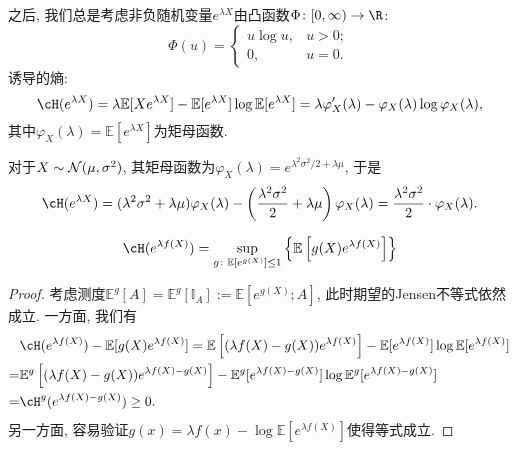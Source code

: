 之后, 我们总是考虑非负随机变量$e^{\lambda X}$由凸函数$\Phi \colon [0, \infty) \to \R$: 
\begin{equation*}
	\Phi(u) = 
	\begin{cases}
		u \log u, & u > 0; \\ 0, & u = 0. 
	\end{cases}
\end{equation*}
诱导的熵: 
\begin{equation}\label{eq:EntropyByMGF}
	\cH(e^{\lambda X}) 
	= \lambda \mathbb{E}[ X e^{\lambda X}] - \mathbb{E}[e^{\lambda X}] \log \mathbb{E}[e^{\lambda X}]
	= \lambda \varphi_X'(\lambda) - \varphi_X(\lambda) \log \varphi_X(\lambda), 
\end{equation}
其中$\varphi_X(\lambda) = \mathbb{E}[e^{\lambda X}]$为矩母函数. 

\begin{example}[Gauss随机变量的熵]
	对于$X \sim \mathcal{N}(\mu, \sigma^2)$, 其矩母函数为$\varphi_X(\lambda) = e^{\lambda^2 \sigma^2 / 2 + \lambda \mu}$, 于是
	\begin{equation}\label{eq:EntropyOfGaussianRV}
		\cH(e^{\lambda X}) 
		= (\lambda^2 \sigma^2 + \lambda \mu) \varphi_X(\lambda) - \left(\frac{\lambda^2 \sigma^2}{2} + \lambda\mu\right) \varphi_X(\lambda) 
		= \frac{\lambda^2 \sigma^2}{2} \cdot \varphi_X(\lambda). 
	\end{equation}
\end{example}

\begin{theorem}[熵的变分表示]\label{thm:VariationalRepresentationForEntropy}
	\begin{equation}\label{eq:VariationalRepresentationForEntropy}
		\cH(e^{\lambda f(X)})
		= \sup_{g \colon \mathbb{E}[e^{g(X)}] \leq 1} \left\{ \mathbb{E} \left[g(X) e^{\lambda f(X)} \right] \right\}
	\end{equation}
\end{theorem}
\begin{proof}
	考虑测度$\mathbb{E}^g[A] = \mathbb{E}^g [\mathbb{I}_A] := \mathbb{E}[e^{g(X)}; A]$, 此时期望的Jensen不等式依然成立. 
	一方面, 我们有
	\begin{align*}
		&\cH(e^{\lambda f(X)}) - \mathbb{E}[g(X) e^{\lambda f(X)}]
		= \mathbb{E}\left[ (\lambda f(X) - g(X)) e^{\lambda f(X)} \right] - \mathbb{E}[ e^{\lambda f(X)}] \log \mathbb{E}[ e^{\lambda f(X)}] \\
		=& \mathbb{E}^g  \left[ (\lambda f(X) - g(X)) e^{\lambda f(X) - g(X)} \right] - \mathbb{E}^g[ e^{\lambda f(X) - g(X)}] \log \mathbb{E}^g[ e^{\lambda f(X) - g(X)}] \\
		=& \cH^g(e^{\lambda f(X) - g(X)}) \geq 0. 
	\end{align*}
	另一方面, 容易验证$g(x) = \lambda f(x) - \log \mathbb{E}[e^{\lambda f(X)}]$使得等式成立. 
\end{proof}

